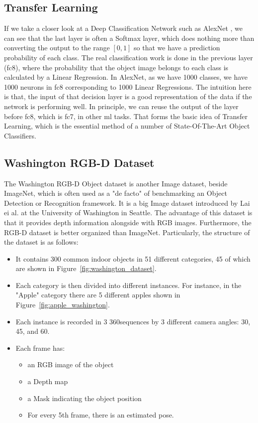 \subsection{Transfer Learning}

If we take a closer look at a Deep Classification Network such as AlexNet \cite{alexnet},
we can see that the last layer is often a Softmax layer, which does nothing more than
converting the output to the range $[0, 1]$ so that we have a prediction probability of
each class. The real classification work is done in the previous layer (fc8), where the
probability that the object image belongs to each class is calculated by a Linear
Regression. In AlexNet, as we have 1000 classes, we have 1000 neurons in fc8 corresponding
to 1000 Linear Regressions. The intuition here is that, the input of that decision layer
is a good representation of the data if the network is performing well. In principle, we
can reuse the output of the layer before fc8, which is fc7, in other \acrshort{ml} tasks.
That forms the basic idea of Transfer Learning, which is the essential method of a number
of State-Of-The-Art Object Classifiers.

\subsection{Washington RGB-D Dataset \cite{washington_rgbd}
\label{subsec:washington_dataset}}
The Washington RGB-D Object dataset is another Image dataset, beside ImageNet, which is
often used as a "de facto" of benchmarking an Object Detection or Recognition framework.
It is a big Image dataset introduced by Lai ei al. \cite{washington_rgbd} at the
University of Washington in Seattle. The advantage of this dataset is that it provides
depth information alongside with RGB images. Furthermore, the RGB-D dataset is better
organized than ImageNet. Particularly, the structure of the dataset is as follows:

\begin{itemize}
	\item It contains 300 common indoor objects in 51 different categories, 45 of which
		are shown in Figure~\ref{fig:washington_dataset}.
	\item Each category is then divided into different instances. For instance, in the
		"Apple" category there are 5 different apples shown in
		Figure~\ref{fig:apple_washington}.
	\item Each instance is recorded in 3 360\degree sequences by 3 different camera
		angles: 30\degree, 45\degree, and 60\degree.
	\item Each frame has:
		\begin{itemize}
			\item an RGB image of the object
			\item a Depth map
			\item a Mask indicating the	object position
			\item For every 5th frame, there is an estimated pose.
		\end{itemize}
\end{itemize}

